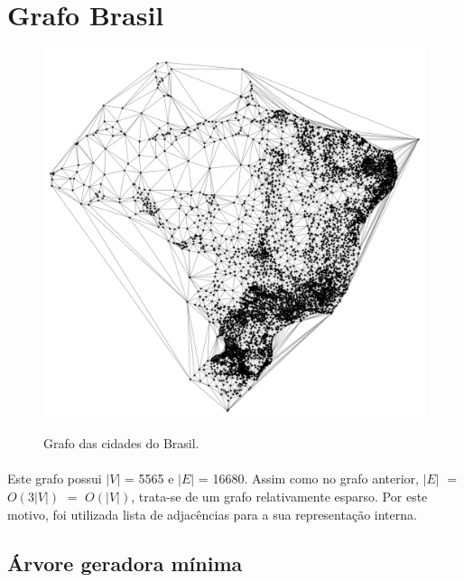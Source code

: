 \documentclass[11pt,a4paper]{article}
\begin{document}
    \newpage
    \section{Grafo Brasil}

        \begin{figure}[htb!]
          \centering
              \captionsetup{justification=centering}  
              \includegraphics[scale=0.5]{BR}
              \label{fig:BR}
              \caption{Grafo das cidades do Brasil.}
        \end{figure}

        \paragraph{}
        Este grafo possui ${|V|}$ = 5565 e ${|E|}$ = 16680. Assim como no grafo anterior, ${|E|}$ $=$ ${O(3|V|)}$ $=$ ${O(|V|)}$, trata-se de um grafo relativamente esparso. Por este motivo, foi utilizada lista de adjacências para a sua representação interna.

        \subsection{Árvore geradora mínima}
\end{document}
